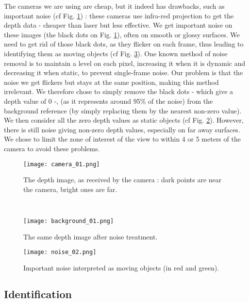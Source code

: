 \documentclass[smallextended]{svjour3}
\begin{document}
The cameras we are using are cheap, but it indeed has drawbacks, such as important noise (cf Fig. \ref{fig:camera1}) : these cameras use infra-red projection to get the depth data - cheaper than laser but less effective. We get important noise on these images (the black dots on Fig. \ref{fig:camera1}), often on smooth or glossy surfaces.
We need to get rid of those black dots, as they flicker on each frame, thus leading to identifying them as moving objects (cf Fig. \ref{fig:noise}). One known method of noise removal is to maintain a level on each pixel, increasing it when it is dynamic and decreasing it when static, to prevent single-frame noise. Our problem is that the noise we get flickers but stays at the same position, making this method irrelevant.
We therefore chose to simply remove the black dots - which give a depth value of 0 -, (as it represents around 95\% of the noise) from the background reference (by simply replacing them by the nearest non-zero value). We then consider all the zero depth values as static objects (cf Fig. \ref{fig:background1}).
However, there is still noise giving non-zero depth values, especially on far away surfaces. We chose to limit the zone of interest of the view to within 4 or 5 meters of the camera to avoid these problems.

\begin{figure*}[t!]
    \centering
    \begin{subfigure}[t]{0.5\textwidth}
        \centering
        \texttt{[image: camera\_01.png]}
        \caption{\label{fig:camera1}The depth image, as received by the camera : dark points are near the camera, bright ones are far.}
    \end{subfigure}%
    ~ 
    \begin{subfigure}[t]{0.5\textwidth}
        \centering
        \texttt{[image: background\_01.png]}
        \caption{\label{fig:background1}The same depth image after noise treatment.}
    \end{subfigure}
    \caption{Noise suppression}
\end{figure*}

\begin{figure}
\centering
\texttt{[image: noise\_02.png]}
\caption{\label{fig:noise}Important noise interpreted as moving objects (in red and green).}
\end{figure}

\subsection{Identification}
\end{document}
